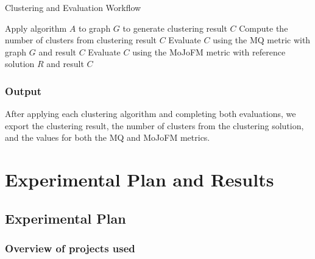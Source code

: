 \documentclass{ieeeaccess}
\begin{document}
\begin{algorithm}
\caption{Clustering and Evaluation Workflow}
\label{alg:clustering_evaluation}
\begin{algorithmic}[1]

    \STATE Apply algorithm $A$ to graph $G$ to generate clustering result $C$
    \STATE Compute the number of clusters from clustering result $C$
    \STATE Evaluate $C$ using the MQ metric with graph $G$ and result $C$
    \STATE Evaluate $C$ using the MoJoFM metric with reference solution $R$ and result $C$
\ENDFOR

\end{algorithmic}
\end{algorithm}

\subsubsection{Output}

After applying each clustering algorithm and completing both evaluations, we export the clustering result, the number of clusters from the clustering solution, and the values for both the MQ and MoJoFM metrics.



\section{Experimental Plan and Results}
\label{sec:experiment}


\subsection{Experimental Plan}
\label{subsec:plan}

\subsubsection{Overview of projects used}
\end{document}
